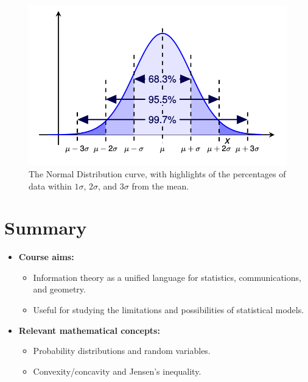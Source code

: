 \begin{figure}[h]
    \centering
    \includegraphics[width=0.6\linewidth]{img/normal_dist.png}
    \caption{The Normal Distribution curve, with highlights of the percentages of data within \(1\sigma\), \(2\sigma\), and \(3\sigma\) from the mean.}
\end{figure}


\section{Summary}

\begin{itemize}
    \item \textbf{Course aims:}
    \begin{itemize}
        \item Information theory as a unified language for statistics, communications, and geometry.
        \item Useful for studying the limitations and possibilities of statistical models.
    \end{itemize}

    \item \textbf{Relevant mathematical concepts:}
    \begin{itemize}
        \item Probability distributions and random variables.
        \item Convexity/concavity and Jensen's inequality.
    \end{itemize}
\end{itemize}

